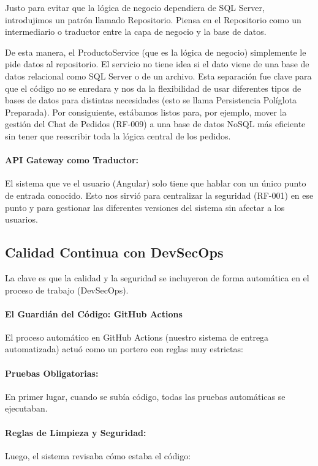 Justo para evitar que la lógica de negocio dependiera de SQL Server, introdujimos un patrón llamado Repositorio. Piensa en el Repositorio como un intermediario o traductor entre la capa de negocio y la base de datos.

De esta manera, el ProductoService (que es la lógica de negocio) simplemente le pide datos al repositorio. El servicio no tiene idea si el dato viene de una base de datos relacional como SQL Server o de un archivo. Esta separación fue clave para que el código no se enredara y nos da la flexibilidad de usar diferentes tipos de bases de datos para distintas necesidades (esto se llama Persistencia Políglota Preparada). Por consiguiente, estábamos listos para, por ejemplo, mover la gestión del Chat de Pedidos (RF-009) a una base de datos NoSQL más eficiente sin tener que reescribir toda la lógica central de los pedidos.

\paragraph{API Gateway como Traductor:} El sistema que ve el usuario (Angular) solo tiene que hablar con un único punto de entrada conocido. Esto nos sirvió para centralizar la seguridad (RF-001) en ese punto y para gestionar las diferentes versiones del sistema sin afectar a los usuarios.

\subsection{Calidad Continua con DevSecOps}

La clave es que la calidad y la seguridad se incluyeron de forma automática en el proceso de trabajo (DevSecOps).

\paragraph{El Guardián del Código: GitHub Actions}

El proceso automático en GitHub Actions (nuestro sistema de entrega automatizada) actuó como un portero con reglas muy estrictas:

\paragraph{Pruebas Obligatorias:} En primer lugar, cuando se subía código, todas las pruebas automáticas se ejecutaban.

\paragraph{Reglas de Limpieza y Seguridad:} Luego, el sistema revisaba cómo estaba el código:

